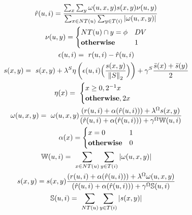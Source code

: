 \begin{gather}
\hat{r}(u,i) = \frac{\sum_{x}\sum_{y} \omega(u,x,y) s(x,y) \nu(u,y)}{\sum_{x \in NT(u)}\sum_{y \in T(i)} |\omega(u,x,y)|} \label{eq:s2_estimate} \\
\nu(u,y) = \begin{cases}
NT(u) \cap y = \phi & DV \\
\textbf{\text{otherwise}} & 1 
\end{cases} \nonumber \\
\epsilon(u,i) =~ r(u,i) - \hat{r}(u,i) \nonumber \\
s(x,y)=~ s(x,y)+\lambda^{S}
\eta \left(\epsilon(u,i) \Big(\frac{s(x,y)}{\left\lVert S \right\rVert _{2}} \Big) \right) + \gamma^{S} \frac{\bar{s}(x)+\bar{s}(y)}{2} \label{eq:s2_scores_feeback} \\
\eta(x)=~ 
\begin{cases}
x \geq 0,  2^{-1}x \\
\textbf{\text{otherwise}},  2x
\end{cases} \nonumber \\
\omega(u,x,y)=~ \omega(u,x,y)\frac{(r(u,i)+\alpha(\hat{r}(u,i)))+\lambda^{\Omega} s(x,y)}{(\hat{r}(u,i)+\alpha(\hat{r}(u,i)))+\gamma^{\Omega}\mathbb{W}(u,i)} \label{eq:s2_w_personalization} \\
\alpha(x) = 
\begin{cases}
x = 0 & 1 \\
\textbf{\text{otherwise}} & 0
\end{cases} \nonumber \\ 
\mathbb{W}(u,i)=~ \sum_{x \in NT(u)}\sum_{y \in T(i)} |\omega(u,x,y)| \nonumber \\
s(x,y)= s(x,y)\frac{(r(u,i)+\alpha(\hat{r}(u,i)))+\lambda^{\Omega}\omega(u,x,y)}{(\hat{r}(u,i)+\alpha(\hat{r}(u,i))) +\gamma^{\Omega}\mathbb{S}(u,i)} \label{eq:s2_s_personalization} \\
\mathbb{S}(u,i)=~ \sum_{NT(u)}\sum_{y \in T(i)} |s(x,y)| \nonumber 
\end{gather}

\clearpage \newpage
